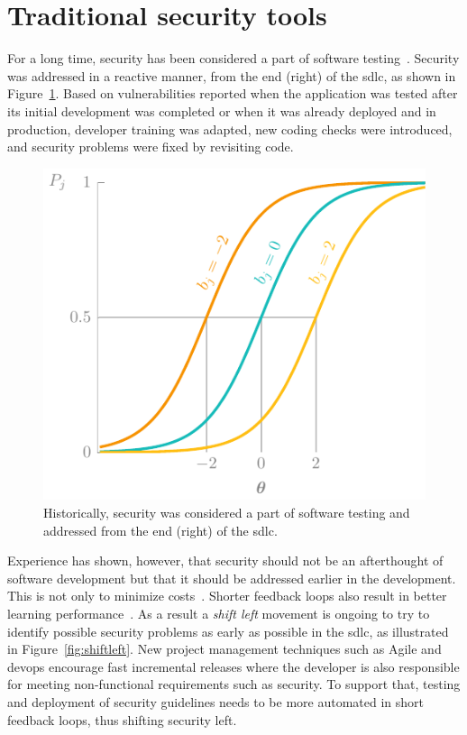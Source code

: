 \section{Traditional security tools}
\label{sec:traditionalsecurity}

For a long time, security has been considered a part of software testing~\cite{sharma2017}.
Security was addressed in a reactive manner, from the end (right) of the \gls{sdlc}, as shown in Figure~\ref{fig:testing}.
Based on vulnerabilities reported when the application was tested after its initial development was completed or when it was already deployed and in production, developer training was adapted, new coding checks were introduced, and \glspl{security problem} were fixed by revisiting code.

\begin{figure}
    \centering
    \includegraphics[page=16]{03-education/figures/tikzfigures.pdf}
  \caption[Security as part of software testing]{Historically, security was considered a part of software testing and addressed from the end (right) of the \gls{sdlc}.}
  \label{fig:testing} 
\end{figure}

Experience has shown, however, that security should not be an afterthought of software development but that it should be addressed earlier in the development. This is not only to minimize costs~\cite{damm2006faults,briand2000comprehensive,baca2008evaluating,layman2007toward}. Shorter feedback loops also result in better learning performance~\cite{syed2015black,whitney2018embedding}. As a result a \emph{shift left} movement is ongoing to try to identify possible \glspl{security problem} as early as possible in the \gls{sdlc}, as illustrated in Figure~\ref{fig:shiftleft}. New project management techniques such as Agile and \gls{devops} encourage fast incremental releases where the developer is also responsible for meeting non-functional requirements such as security.
To support that, testing and deployment of security guidelines needs to be more automated in short feedback loops, thus shifting security left.

